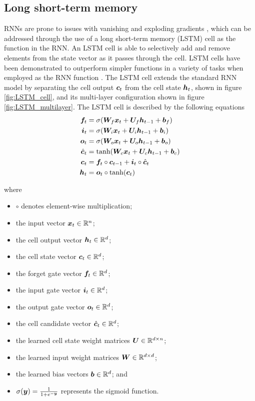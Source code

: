 \subsection{Long short-term memory}
RNNs are prone to issues with vanishing and exploding gradients \cite{Goodfellow-et-al-2016}, which can be addressed through the use of a long short-term memory (LSTM) \cite{hochreiter1997long} cell as the function in the RNN.
An LSTM cell is able to selectively add and remove elements from the state vector as it passes through the cell.
LSTM cells have been demonstrated to outperform simpler functions in a variety of tasks when employed as the RNN function \cite{Chung2014}\cite{jozefowicz2015empirical}\cite{le2015simple}.
The LSTM cell extends the standard RNN model by separating the cell output ${\bm{c}}_t$ from the cell state ${\bm{h}}_t$, shown in figure \ref{fig:LSTM_cell}, and its multi-layer configuration shown in figure \ref{fig:LSTM_multilayer}.
The LSTM cell is described by the following equations
\begin{align}
{\bm{f}}_t &= \sigma({\bm{W}}_{f} {\bm{x}}_t + {\bm{U}}_{f} {\bm{h}}_{t-1} + {\bm{b}}_f) \label{eq:forget_lstm}\\
{\bm{i}}_t &= \sigma({\bm{W}}_{i} {\bm{x}}_t + {\bm{U}}_{i} {\bm{h}}_{t-1} + {\bm{b}}_i) \\
{\bm{o}}_t &= \sigma({\bm{W}}_{o} {\bm{x}}_t + {\bm{U}}_{o} {\bm{h}}_{t-1} + {\bm{b}}_o) \\
\hat{{\bm{c}}}_t &= \text{tanh}({\bm{W}}_{c} {\bm{x}}_t + {\bm{U}}_{c} {\bm{h}}_{t-1} + {\bm{b}}_c) \\
{\bm{c}}_t &= {\bm{f}}_t \circ {\bm{c}}_{t-1} + {\bm{i}}_t \circ \hat{{\bm{c}}}_t \\
{\bm{h}}_t &= {\bm{o}}_t \circ \text{tanh}({\bm{c}}_t) \label{eq:cell_state_lstm}
\end{align}

where 
\begin{itemize}
	\item $\circ$ denotes element-wise multiplication;
	\item the input vector ${\bm{x}}_t \in \mathbb{R}^{n}$;
	\item the cell output vector ${\bm{h}}_t \in \mathbb{R}^{d}$;
	\item the cell state vector ${\bm{c}}_t \in \mathbb{R}^{d}$;
	\item  the forget gate vector ${\bm{f}}_t \in \mathbb{R}^{d}$;
	\item the input gate vector ${\bm{i}}_t \in \mathbb{R}^{d}$;
	\item the output gate vector ${\bm{o}}_t \in \mathbb{R}^{d}$;
	\item the cell candidate vector $\hat{{\bm{c}}}_t \in \mathbb{R}^{d}$;
	\item the learned cell state weight matrices ${\bm{U}} \in \mathbb{R}^{d \times n}$;
	\item the learned input weight matrices ${\bm{W}} \in \mathbb{R}^{d \times d}$;
	\item the learned bias vectors ${\bm{b}} \in \mathbb{R}^{d}$; and
	\item $\sigma({\bm{y}}) = \frac{1}{1 + e^{-{\bm{y}}}}$ represents the sigmoid function.
\end{itemize}

